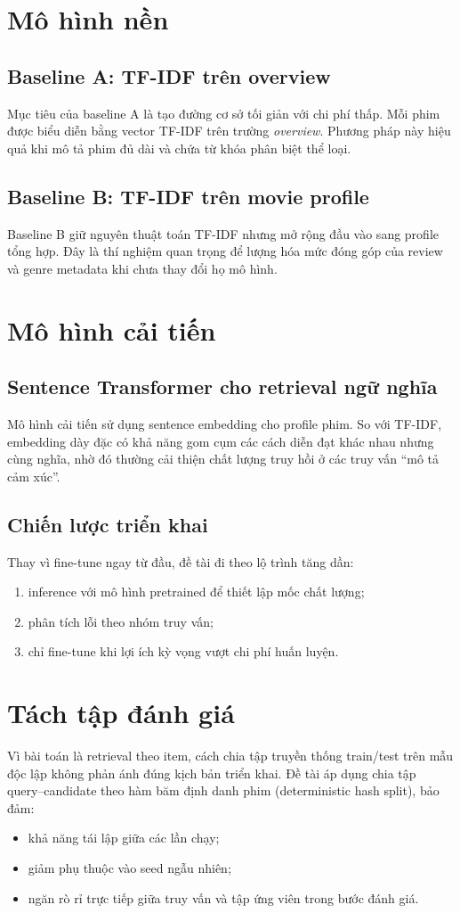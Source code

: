 \section{Mô hình nền}
\subsection{Baseline A: TF-IDF trên overview}
Mục tiêu của baseline A là tạo đường cơ sở tối giản với chi phí thấp. Mỗi phim được biểu diễn bằng vector TF-IDF trên trường \textit{overview}. Phương pháp này hiệu quả khi mô tả phim đủ dài và chứa từ khóa phân biệt thể loại.

\subsection{Baseline B: TF-IDF trên movie profile}
Baseline B giữ nguyên thuật toán TF-IDF nhưng mở rộng đầu vào sang profile tổng hợp. Đây là thí nghiệm quan trọng để lượng hóa mức đóng góp của review và genre metadata khi chưa thay đổi họ mô hình.

\section{Mô hình cải tiến}
\subsection{Sentence Transformer cho retrieval ngữ nghĩa}
Mô hình cải tiến sử dụng sentence embedding cho profile phim. So với TF-IDF, embedding dày đặc có khả năng gom cụm các cách diễn đạt khác nhau nhưng cùng nghĩa, nhờ đó thường cải thiện chất lượng truy hồi ở các truy vấn ``mô tả cảm xúc''.

\subsection{Chiến lược triển khai}
Thay vì fine-tune ngay từ đầu, đề tài đi theo lộ trình tăng dần:
\begin{enumerate}[label=\alph*.]
    \item inference với mô hình pretrained để thiết lập mốc chất lượng;
    \item phân tích lỗi theo nhóm truy vấn;
    \item chỉ fine-tune khi lợi ích kỳ vọng vượt chi phí huấn luyện.
\end{enumerate}

\section{Tách tập đánh giá}
Vì bài toán là retrieval theo item, cách chia tập truyền thống train/test trên mẫu độc lập không phản ánh đúng kịch bản triển khai. Đề tài áp dụng chia tập query--candidate theo hàm băm định danh phim (deterministic hash split), bảo đảm:
\begin{itemize}
    \item khả năng tái lập giữa các lần chạy;
    \item giảm phụ thuộc vào seed ngẫu nhiên;
    \item ngăn rò rỉ trực tiếp giữa truy vấn và tập ứng viên trong bước đánh giá.
\end{itemize}

